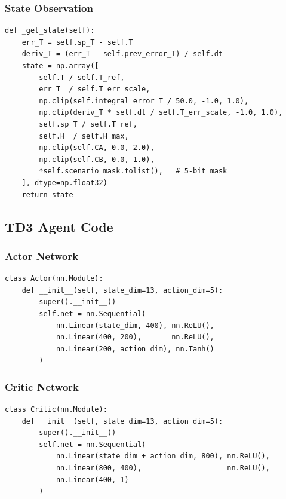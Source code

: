 \documentclass[12pt,a4paper]{article}
\begin{document}
\subsubsection{State Observation}

\begin{lstlisting}[style=python,
  caption={13-D state vector with scenario mask appended.}]
def _get_state(self):
    err_T = self.sp_T - self.T
    deriv_T = (err_T - self.prev_error_T) / self.dt
    state = np.array([
        self.T / self.T_ref,
        err_T  / self.T_err_scale,
        np.clip(self.integral_error_T / 50.0, -1.0, 1.0),
        np.clip(deriv_T * self.dt / self.T_err_scale, -1.0, 1.0),
        self.sp_T / self.T_ref,
        self.H  / self.H_max,
        np.clip(self.CA, 0.0, 2.0),
        np.clip(self.CB, 0.0, 1.0),
        *self.scenario_mask.tolist(),   # 5-bit mask
    ], dtype=np.float32)
    return state
\end{lstlisting}

\subsection{TD3 Agent Code}

\subsubsection{Actor Network}

\begin{lstlisting}[style=python, caption={Actor: $13\to400\to200\to5$ with Tanh output.}]
class Actor(nn.Module):
    def __init__(self, state_dim=13, action_dim=5):
        super().__init__()
        self.net = nn.Sequential(
            nn.Linear(state_dim, 400), nn.ReLU(),
            nn.Linear(400, 200),       nn.ReLU(),
            nn.Linear(200, action_dim), nn.Tanh()
        )
\end{lstlisting}

\subsubsection{Critic Network}

\begin{lstlisting}[style=python, caption={Critic: $(13+5)\to800\to400\to1$.}]
class Critic(nn.Module):
    def __init__(self, state_dim=13, action_dim=5):
        super().__init__()
        self.net = nn.Sequential(
            nn.Linear(state_dim + action_dim, 800), nn.ReLU(),
            nn.Linear(800, 400),                    nn.ReLU(),
            nn.Linear(400, 1)
        )
\end{lstlisting}
\end{document}
